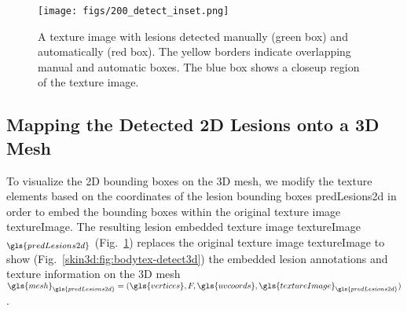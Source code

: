 \documentclass[journal]{IEEEtran}
\begin{document}
\begin{figure}[ht]
\centering
\texttt{[image: figs/200\_detect\_inset.png]}
\caption{A texture image with lesions detected manually (green box) and automatically (red box). The yellow borders indicate overlapping manual and automatic boxes. The blue box shows a closeup region of the texture image.}
\label{skin3d:fig:bodytex-detect2d}
\end{figure}

\subsection{Mapping the Detected 2D Lesions onto a 3D Mesh}
To visualize the 2D bounding boxes on the 3D mesh, we modify the texture elements based on the coordinates of the lesion bounding boxes \gls{predLesions2d} in order to embed the bounding boxes within the original texture image \gls{textureImage}. The resulting lesion embedded texture image \gls{textureImage}$_{\gls{predLesions2d}}$ (Fig.~\ref{skin3d:fig:bodytex-detect2d}) replaces the original texture image \gls{textureImage} to show (Fig.~\ref{skin3d:fig:bodytex-detect3d}) the embedded lesion annotations and texture information on the 3D mesh $\gls{mesh}_{\gls{predLesions2d}} = (\gls{vertices}, F, \gls{uvcoords}, \gls{textureImage}_{\gls{predLesions2d}})$.
\end{document}
